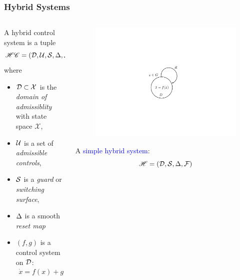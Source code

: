 \documentclass{beamer}
\begin{document}
\begin{frame}
  \frametitle{Hybrid Systems}
  \begin{columns}[t]
    \begin{column}{.63\textwidth}
      \begin{definition}
        A \alert{hybrid control system} is a tuple \vspace{-.3cm}
        $$\HCS = \hcsystem, \vspace{-.4cm}$$
        where
        \begin{itemize}
        \item
          $\mathcal{D} \subset \mathcal{X}$ is the {\em domain of admissiblity} with state space $\mathcal{X}$,
        \item
          $\mathcal{U}$ is a set of {\em admissible controls},
        \item
          $\mathcal{S}$ is a {\em guard} or {\em switching surface},
        \item
          $\Delta$ is a smooth {\em reset map}
        \item
          $(f, g)$ is a control system on $\mathcal{D}$: \vspace{-3mm}
          \begin{align*}
            \dot{x} = f(x) + g(x) \, u.
        \end{align*}
        \end{itemize}
      \end{definition}
    \end{column}
    \begin{column}{.4\textwidth}
      \begin{figure}
        \centering
        \includegraphics[width=.9\textwidth]{hsystem}\\
      \end{figure}
      A \textcolor{blue}{simple hybrid system}:\vspace{-.3cm}
      $$\mathscr{H} = (\mathcal{D}, \mathcal{S}, \Delta, \mathcal{F})$$
    \end{column}
  \end{columns}
\end{frame}
\end{document}
